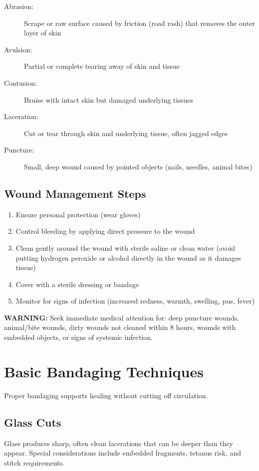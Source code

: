 \begin{description}
  \item[Abrasion:] Scrape or raw surface caused by friction (road rash) that removes the outer layer of skin
  \item[Avulsion:] Partial or complete tearing away of skin and tissue
  \item[Contusion:] Bruise with intact skin but damaged underlying tissues
  \item[Laceration:] Cut or tear through skin and underlying tissue, often jagged edges
  \item[Puncture:] Small, deep wound caused by pointed objects (nails, needles, animal bites)
\end{description}

\subsection{Wound Management Steps}

\begin{enumerate}[leftmargin=*]
\item Ensure personal protection (wear gloves)
\item Control bleeding by applying direct pressure to the wound
\item Clean gently around the wound with sterile saline or clean water (avoid putting hydrogen peroxide or alcohol directly in the wound as it damages tissue)
\item Cover with a sterile dressing or bandage
\item Monitor for signs of infection (increased redness, warmth, swelling, pus, fever)
\end{enumerate}
\textbf{WARNING:} Seek immediate medical attention for: deep puncture wounds, animal/bite wounds, dirty wounds not cleaned within 8 hours, wounds with embedded objects, or signs of systemic infection.

\section{Basic Bandaging Techniques}

Proper bandaging supports healing without cutting off circulation.

\subsection{Glass Cuts}

Glass produces sharp, often clean lacerations that can be deeper than they appear. Special considerations include embedded fragments, tetanus risk, and stitch requirements.

